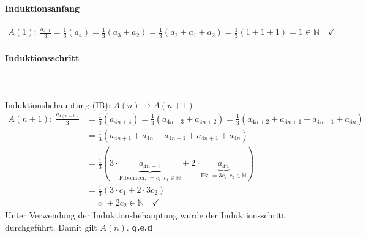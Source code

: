 \documentclass{article}
\begin{document}
    \paragraph*{Induktionsanfang} 
    \begin{align*}
        A(1): \: \frac{a_{4\cdot 1}}{3} = \frac{1}{3}(a_4) = \frac{1}{3}(a_3 + a_2) =  \frac{1}{3}(a_2 + a_1 + a_2) = \frac{1}{3}(1+1+1) = 1 \in \mathbb{N} \quad \checkmark
    \end{align*}
    \paragraph*{Induktionsschritt} \hfill\\\\
    Induktionsbehauptung (IB): $A(n) \rightarrow A(n+1)$
    \begin{align*}
        A(n+1): \: \frac{a_{4(n+1)}}{3} &= \frac{1}{3}(a_{4n+4}) = \frac{1}{3}(a_{4n+3} + a_{4n+2}) = \frac{1}{3}(a_{4n+2} + a_{4n+1} + a_{4n+1} + a_{4n}) \\
        &= \frac{1}{3}(a_{4n+1} + a_{4n} + a_{4n+1} + a_{4n+1} + a_{4n}) \\
        &= \frac{1}{3}\left(3\cdot \underbrace{a_{4n+1}}_{\textrm{Fibonacci: }=c_1, c_1 \in \mathbb{N}} + 2 \cdot \underbrace{a_{4n}}_{\textrm{IB: } =3c_2, c_2\in \mathbb{N}}\right) \\
        &= \frac{1}{3} (3\cdot c_1 + 2\cdot 3c_2) \\
        &= c_1 + 2c_2 \in \mathbb{N} \quad \checkmark
    \end{align*}
    Unter Verwendung der Induktionsbehauptung wurde der Induktionsschritt durchgeführt. Damit gilt $A(n)$. \textbf{q.e.d}
\end{document}
